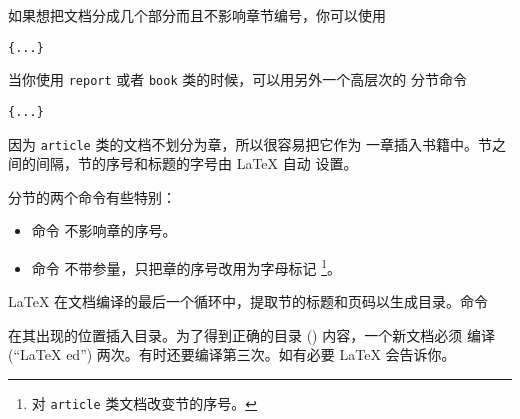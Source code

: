 如果想把文档分成几个部分而且不影响章节编号，你可以使用
\begin{lscommand}
\verb|{...}|
\end{lscommand}

当你使用 \texttt{report} 或者 \texttt{book} 类的时候，可以用另外一个高层次的
分节命令
\begin{lscommand}
\verb|{...}|
\end{lscommand}

因为 \texttt{article} 类的文档不划分为章，所以很容易把它作为
一章插入书籍中。节之间的间隔，节的序号和标题的字号由 \LaTeX{} 自动
设置。

分节的两个命令有些特别：
\begin{itemize}
\item 命令  不影响章的序号。
\item 命令  不带参量，只把章的序号改用为字母标记
\footnote{对 \texttt{article} 类文档改变节的序号。}。
\end{itemize}


\LaTeX{} 在文档编译的最后一个循环中，提取节的标题和页码以生成目录。命令
\begin{lscommand}
\end{lscommand}
\noindent 在其出现的位置插入目录。为了得到正确的目录 () 内容，一个新文档必须 编译 (``\LaTeX
ed'') 两次。有时还要编译第三次。如有必要 \LaTeX{} 会告诉你。

